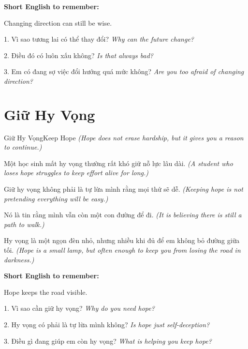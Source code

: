 \begin{ghinhoanh}
\textbf{Short English to remember:}

Changing direction can still be wise.

\end{ghinhoanh}

\begin{tuhocnhanh}
1. Vì sao tương lai có thể thay đổi? \textit{Why can the future change?}

2. Điều đó có luôn xấu không? \textit{Is that always bad?}

3. Em có đang sợ việc đổi hướng quá mức không? \textit{Are you too afraid of changing direction?}
\end{tuhocnhanh}
\ngancach

\section{Giữ Hy Vọng}
\begin{truyen}{Giữ Hy Vọng}{Keep Hope}
\textit{(Hope does not erase hardship, but it gives you a reason to continue.)}

Một học sinh mất hy vọng thường rất khó giữ nỗ lực lâu dài.
\textit{(A student who loses hope struggles to keep effort alive for long.)}

Giữ hy vọng không phải là tự lừa mình rằng mọi thứ sẽ dễ.
\textit{(Keeping hope is not pretending everything will be easy.)}

Nó là tin rằng mình vẫn còn một con đường để đi.
\textit{(It is believing there is still a path to walk.)}
\end{truyen}

\begin{baihoc}
Hy vọng là một ngọn đèn nhỏ, nhưng nhiều khi đủ để em không bỏ đường giữa tối.
\textit{(Hope is a small lamp, but often enough to keep you from losing the road in darkness.)}
\end{baihoc}

\begin{ghinhoanh}
\textbf{Short English to remember:}

Hope keeps the road visible.

\end{ghinhoanh}

\begin{tuhocnhanh}
1. Vì sao cần giữ hy vọng? \textit{Why do you need hope?}

2. Hy vọng có phải là tự lừa mình không? \textit{Is hope just self-deception?}

3. Điều gì đang giúp em còn hy vọng? \textit{What is helping you keep hope?}
\end{tuhocnhanh}
\ngancach

